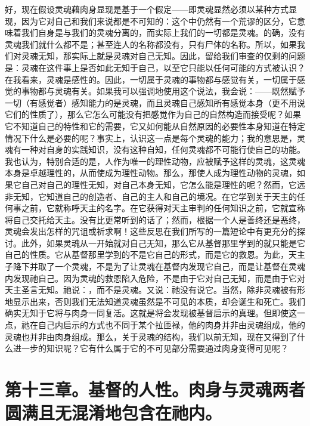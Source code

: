 好，现在假设灵魂藉肉身显现是基于一个假定——即灵魂显然必须以某种方式显现，因为它对自己和我们来说都是不可知的：这个中仍然有一个荒谬的区分，它意味着我们自身是与我们的灵魂分离的，而实际上我们的一切都是灵魂。的确，没有灵魂我们就什么都不是；甚至连人的名称都没有，只有尸体的名称。所以，如果我们对灵魂无知，那实际上就是灵魂对自己无知。因此，留给我们审查的仅剩的问题是：灵魂在这件事上是否如此无知于自己，以至它只能以任何可能的方式被认识？在我看来，灵魂是感性的。因此，一切属于灵魂的事物都与感觉有关，一切属于感觉的事物都与灵魂有关。如果我可以强调地使用这个说法，我会说：——既然赋予一切（有感觉者）感知能力的是灵魂，而且灵魂自己感知所有感觉本身（更不用说它们的性质了），那么它怎么可能没有把感觉作为自己的自然构造而接受呢？如果它不知道自己的特性和它的需要，它又如何能从自然原因的必要性本身知道在特定情况下什么是必要的呢？事实上，认识这一点是每个灵魂的能力；我的意思是，灵魂有一种对自身的实践知识，没有这种自知，任何灵魂都不可能行使自己的功能。我也认为，特别合适的是，人作为唯一的理性动物，应被赋予这样的灵魂，这灵魂本身是卓越理性的，从而使成为理性动物。那么，那使人成为理性动物的灵魂，如果它自己对自己的理性无知，对自己本身无知，它怎么能是理性的呢？然而，它远非无知，它知道自己的创造者、自己的主人和自己的境况。在它学到关于天主的任何事之前，它就称呼天主的名字。在它获得对天主审判的任何知识之前，它就宣称将自己交托给天主。没有比更常听到的话了；然而，根据一个人是善终还是恶终，灵魂会发出怎样的咒诅或祈求啊！这些反思在我们所写的一篇短论中有更充分的探讨。此外，如果灵魂从一开始就对自己无知，那么它从基督那里学到的就只能是它自己的性质。它从基督那里学到的不是它自己的形式，而是它的救恩。为此，天主子降下并取了一个灵魂，不是为了让灵魂在基督内发现它自己，而是让基督在灵魂内发现祂自己。因为灵魂的救恩陷入危险，不是由于它对自己无知，而是由于它对天主圣言无知。祂说：，而不是灵魂。又说：祂没有说它。当然，除非灵魂被有形地显示出来，否则我们无法知道灵魂虽然是不可见的本质，却会诞生和死亡。我们确实无知于它将与肉身一同复活。这就是将会发现被基督启示的真理。但即使这一点，祂在自己内启示的方式也不同于某个拉匝禄，他的肉身并非由灵魂组成，他的灵魂也并非由肉身组成。那么，关于灵魂的结构，我们以前无知，现在又得到了什么进一步的知识呢？它有什么属于它的不可见部分需要通过肉身变得可见呢？\par


\section{第十三章。基督的人性。肉身与灵魂两者圆满且无混淆地包含在祂内。}

